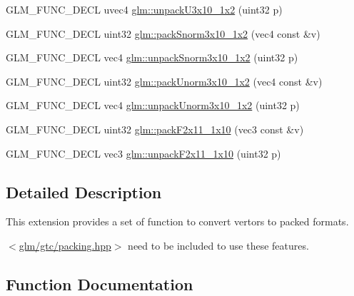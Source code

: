 \begin{DoxyCompactItemize}
\item 
G\+L\+M\+\_\+\+F\+U\+N\+C\+\_\+\+D\+E\+CL uvec4 \hyperlink{group__gtc__packing_ga119aa2d7d55952f9dc4214390a6ffefc}{glm\+::unpack\+U3x10\+\_\+1x2} (uint32 p)
\item 
G\+L\+M\+\_\+\+F\+U\+N\+C\+\_\+\+D\+E\+CL uint32 \hyperlink{group__gtc__packing_ga0d4157cec37c0312216a7be1cc92df54}{glm\+::pack\+Snorm3x10\+\_\+1x2} (vec4 const \&v)
\item 
G\+L\+M\+\_\+\+F\+U\+N\+C\+\_\+\+D\+E\+CL vec4 \hyperlink{group__gtc__packing_ga8b8bb827a3743ca553d8702d3e337101}{glm\+::unpack\+Snorm3x10\+\_\+1x2} (uint32 p)
\item 
G\+L\+M\+\_\+\+F\+U\+N\+C\+\_\+\+D\+E\+CL uint32 \hyperlink{group__gtc__packing_ga2cf2d11b40bd48639110456fd74c2e33}{glm\+::pack\+Unorm3x10\+\_\+1x2} (vec4 const \&v)
\item 
G\+L\+M\+\_\+\+F\+U\+N\+C\+\_\+\+D\+E\+CL vec4 \hyperlink{group__gtc__packing_gaf69ace2b5e9234f8afb4e99c3df1193d}{glm\+::unpack\+Unorm3x10\+\_\+1x2} (uint32 p)
\item 
G\+L\+M\+\_\+\+F\+U\+N\+C\+\_\+\+D\+E\+CL uint32 \hyperlink{group__gtc__packing_ga8c2a0eeee677ca4dafd9e093d9e81062}{glm\+::pack\+F2x11\+\_\+1x10} (vec3 const \&v)
\item 
G\+L\+M\+\_\+\+F\+U\+N\+C\+\_\+\+D\+E\+CL vec3 \hyperlink{group__gtc__packing_ga8b9c7991eb021d95c778bf5c0b2f7824}{glm\+::unpack\+F2x11\+\_\+1x10} (uint32 p)
\end{DoxyCompactItemize}


\subsection{Detailed Description}
This extension provides a set of function to convert vertors to packed formats. 

$<$\hyperlink{gtc_2packing_8hpp}{glm/gtc/packing.\+hpp}$>$ need to be included to use these features. 

\subsection{Function Documentation}
